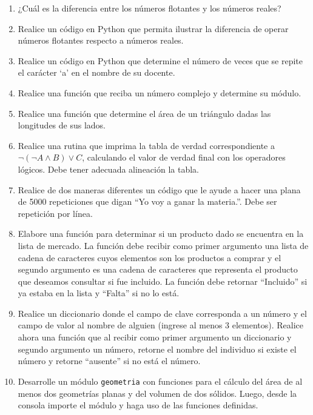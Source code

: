\begin{enumerate}
\def\labelenumi{\arabic{enumi}.}

\item
  ¿Cuál es la diferencia entre los números flotantes y los números
  reales?
\item
  Realice un código en Python que permita ilustrar la diferencia de
  operar números flotantes respecto a números reales.
\item
  Realice un código en Python que determine el número de veces que se
  repite el carácter `a' en el nombre de su docente.
\item
  Realice una función que reciba un número complejo y determine su
  módulo.
\item
  Realice una función que determine el área de un triángulo dadas las
  longitudes de sus lados.
\item
  Realice una rutina que imprima la tabla de verdad correspondiente a
  \(\neg(\neg A \wedge B) \vee C\), calculando el valor de verdad final
  con los operadores lógicos. Debe tener adecuada alineación la tabla.
\item
  Realice de dos maneras diferentes un código que le ayude a hacer una
  plana de 5000 repeticiones que digan ``Yo voy a ganar la materia.''.
  Debe ser repetición por línea.
\item
  Elabore una función para determinar si un producto dado se encuentra
  en la lista de mercado. La función debe recibir como primer argumento
  una lista de cadena de caracteres cuyos elementos son los productos a
  comprar y el segundo argumento es una cadena de caracteres que
  representa el producto que deseamos consultar si fue incluido. La
  función debe retornar ``Incluido'' si ya estaba en la lista y
  ``Falta'' si no lo está.
\item
  Realice un diccionario donde el campo de clave corresponda a un número
  y el campo de valor al nombre de alguien (ingrese al menos 3
  elementos). Realice ahora una función que al recibir como primer
  argumento un diccionario y segundo argumento un número, retorne el
  nombre del individuo si existe el número y retorne ``ausente'' si no
  está el número.
\item
  Desarrolle un módulo \texttt{geometria} con funciones para el cálculo
  del área de al menos dos geometrías planas y del volumen de dos
  sólidos. Luego, desde la consola importe el módulo y haga uso de las
  funciones definidas.
\end{enumerate}



